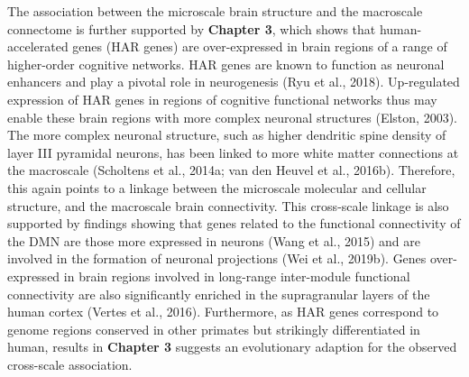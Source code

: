 \begin{refsection}
The association between the microscale brain structure and the macroscale connectome is further supported by \textbf{Chapter 3}, which shows that human-accelerated genes (HAR genes) are over-expressed in brain regions of a range of higher-order cognitive networks. HAR genes are known to function as neuronal enhancers and play a pivotal role in neurogenesis (Ryu et al., 2018). Up-regulated expression of HAR genes in regions of cognitive functional networks thus may enable these brain regions with more complex neuronal structures (Elston, 2003). The more complex neuronal structure, such as higher dendritic spine density of layer III pyramidal neurons, has been linked to more white matter connections at the macroscale (Scholtens et al., 2014a; van den Heuvel et al., 2016b). Therefore, this again points to a linkage between the microscale molecular and cellular structure, and the macroscale brain connectivity. This cross-scale linkage is also supported by findings showing that genes related to the functional connectivity of the DMN are those more expressed in neurons (Wang et al., 2015) and are involved in the formation of neuronal projections (Wei et al., 2019b). Genes over-expressed in brain regions involved in long-range inter-module functional connectivity are also significantly enriched in the supragranular layers of the human cortex (Vertes et al., 2016). Furthermore, as HAR genes correspond to genome regions conserved in other primates but strikingly differentiated in human, results in \textbf{Chapter 3} suggests an evolutionary adaption for the observed cross-scale association.


\end{refsection}
